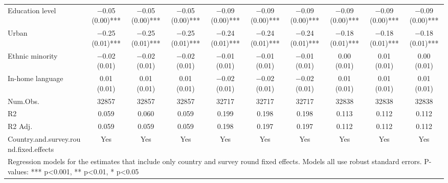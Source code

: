 \begin{table}[H]
\begin{tabular}[t]{lccccccccc}
Education level & \num{-0.05} (\num{0.00})*** & \num{-0.05} (\num{0.00})*** & \num{-0.05} (\num{0.00})*** & \num{-0.09} (\num{0.00})*** & \num{-0.09} (\num{0.00})*** & \num{-0.09} (\num{0.00})*** & \num{-0.09} (\num{0.00})*** & \num{-0.09} (\num{0.00})*** & \num{-0.09} (\num{0.00})***\\
Urban & \num{-0.25} (\num{0.01})*** & \num{-0.25} (\num{0.01})*** & \num{-0.25} (\num{0.01})*** & \num{-0.24} (\num{0.01})*** & \num{-0.24} (\num{0.01})*** & \num{-0.24} (\num{0.01})*** & \num{-0.18} (\num{0.01})*** & \num{-0.18} (\num{0.01})*** & \num{-0.18} (\num{0.01})***\\
Ethnic minority & \num{-0.02} (\num{0.01}) & \num{-0.02} (\num{0.01}) & \num{-0.02} (\num{0.01}) & \num{-0.01} (\num{0.01}) & \num{-0.01} (\num{0.01}) & \num{-0.01} (\num{0.01}) & \num{0.00} (\num{0.01}) & \num{0.01} (\num{0.01}) & \num{0.00} (\num{0.01})\\
In-home language & \num{0.01} (\num{0.01}) & \num{0.01} (\num{0.01}) & \num{0.01} (\num{0.01}) & \num{-0.02} (\num{0.01}) & \num{-0.02} (\num{0.01}) & \num{-0.02} (\num{0.01}) & \num{0.01} (\num{0.01}) & \num{0.01} (\num{0.01}) & \num{0.01} (\num{0.01})\\
\midrule
Num.Obs. & \num{32857} & \num{32857} & \num{32857} & \num{32717} & \num{32717} & \num{32717} & \num{32838} & \num{32838} & \num{32838}\\
R2 & \num{0.059} & \num{0.060} & \num{0.059} & \num{0.199} & \num{0.198} & \num{0.198} & \num{0.113} & \num{0.112} & \num{0.112}\\
R2 Adj. & \num{0.059} & \num{0.059} & \num{0.059} & \num{0.198} & \num{0.197} & \num{0.197} & \num{0.112} & \num{0.112} & \num{0.112}\\
Country.and.survey.round.fixed.effects & Yes & Yes & Yes & Yes & Yes & Yes & Yes & Yes & Yes\\
\bottomrule
\multicolumn{10}{l}{\rule{0pt}{1em}Regression models for the estimates that include only country and survey round fixed effects. Models all use robust standard errors. P-values: *** p<0.001, ** p<0.01, * p<0.05}\\
\end{tabular}
\end{table}
